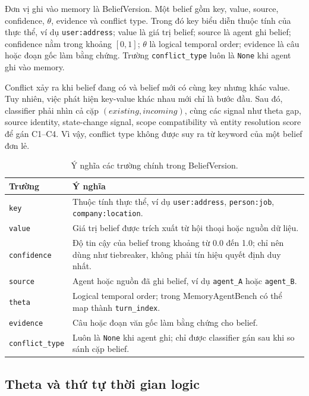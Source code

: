 \documentclass[12pt,a4paper]{article}
\newcommand{\code}[1]{\texttt{#1}}
\begin{document}
Đơn vị ghi vào memory là BeliefVersion. Một belief gồm key, value, source, confidence, \(\theta\), evidence và conflict type. Trong đó key biểu diễn thuộc tính của thực thể, ví dụ \code{user:address}; value là giá trị belief; source là agent ghi belief; confidence nằm trong khoảng \([0,1]\); \(\theta\) là logical temporal order; evidence là câu hoặc đoạn gốc làm bằng chứng. Trường \code{conflict\_type} luôn là \code{None} khi agent ghi vào memory.

Conflict xảy ra khi belief đang có và belief mới có cùng key nhưng khác value. Tuy nhiên, việc phát hiện key-value khác nhau mới chỉ là bước đầu. Sau đó, classifier phải nhìn cả cặp \((existing, incoming)\), cùng các signal như theta gap, source identity, state-change signal, scope compatibility và entity resolution score để gán C1--C4. Vì vậy, conflict type không được suy ra từ keyword của một belief đơn lẻ.

\begin{table}[H]
\centering
\caption{Ý nghĩa các trường chính trong BeliefVersion.}
\label{tab:belief-fields}
\begin{tabular}{p{}p{}}
\toprule
\textbf{Trường} & \textbf{Ý nghĩa} \\
\midrule
\code{key} & Thuộc tính thực thể, ví dụ \code{user:address}, \code{person:job}, \code{company:location}. \\
\code{value} & Giá trị belief được trích xuất từ hội thoại hoặc nguồn dữ liệu. \\
\code{confidence} & Độ tin cậy của belief trong khoảng từ 0.0 đến 1.0; chỉ nên dùng như tiebreaker, không phải tín hiệu quyết định duy nhất. \\
\code{source} & Agent hoặc nguồn đã ghi belief, ví dụ \code{agent\_A} hoặc \code{agent\_B}. \\
\code{theta} & Logical temporal order; trong MemoryAgentBench có thể map thành \code{turn\_index}. \\
\code{evidence} & Câu hoặc đoạn văn gốc làm bằng chứng cho belief. \\
\code{conflict\_type} & Luôn là \code{None} khi agent ghi; chỉ được classifier gán sau khi so sánh cặp belief. \\
\bottomrule
\end{tabular}
\end{table}

\subsection{Theta và thứ tự thời gian logic}
\end{document}
